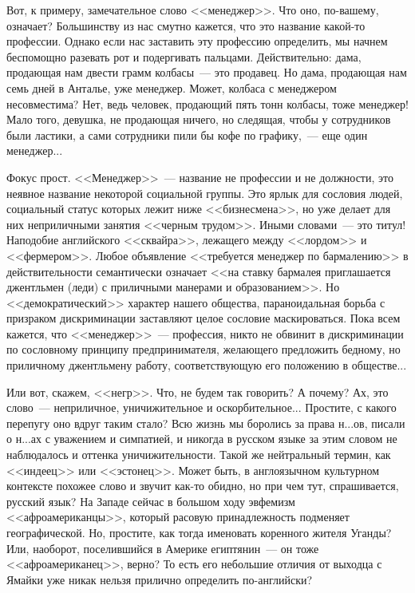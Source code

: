 \documentclass{scrbook}
\newcommand{\flqq}{<<}
\newcommand{\frqq}{>>}
\newcommand{\mdash}{~--- }
\newcommand{\commamdash}{~--- } %
\begin{document}
Вот, к примеру, замечательное слово {\flqq}менеджер{\frqq}. Что оно, по-вашему, означает? Большинству из нас смутно кажется, что это название какой-то профессии. Однако если нас заставить эту профессию определить, мы начнем беспомощно разевать рот и подергивать пальцами. Действительно: дама, продающая нам двести грамм колбасы{\mdash}это продавец. Но дама, продающая нам семь дней в Анталье, уже менеджер. Может, колбаса с менеджером несовместима? Нет, ведь человек, продающий пять тонн колбасы, тоже менеджер! Мало того, девушка, не продающая ничего, но следящая, чтобы у сотрудников были ластики, а сами сотрудники пили бы кофе по графику,{\commamdash}еще один менеджер...

Фокус прост. {\flqq}Менеджер{\frqq}{\mdash}название не профессии и не должности, это неявное название некоторой социальной группы. Это ярлык для сословия людей, социальный статус которых лежит ниже {\flqq}бизнесмена{\frqq}, но уже делает для них неприличными занятия {\flqq}черным трудом{\frqq}. Иными словами{\mdash}это титул! Наподобие английского {\flqq}сквайра{\frqq}, лежащего между {\flqq}лордом{\frqq} и {\flqq}фермером{\frqq}. Любое объявление {\flqq}требуется менеджер по бармалению{\frqq} в действительности семантически означает {\flqq}на ставку бармалея приглашается джентльмен (леди) с приличными манерами и образованием{\frqq}. Но {\flqq}демократический{\frqq} характер нашего общества, параноидальная борьба с призраком дискриминации заставляют целое сословие маскироваться. Пока всем кажется, что {\flqq}менеджер{\frqq}{\mdash}профессия, никто не обвинит в дискриминации по сословному принципу предпринимателя, желающего предложить бедному, но приличному джентльмену работу, соответствующую его положению в обществе...

Или вот, скажем, {\flqq}негр{\frqq}. Что, не будем так говорить? А почему? Ах, это слово{\mdash}неприличное, уничижительное и оскорбительное... Простите, с какого перепугу оно вдруг таким стало? Всю жизнь мы боролись за права н...ов, писали о н...ах с уважением и симпатией, и никогда в русском языке за этим словом не наблюдалось и оттенка уничижительности. Такой же нейтральный термин, как {\flqq}индеец{\frqq} или {\flqq}эстонец{\frqq}. Может быть, в англоязычном культурном контексте похожее слово и звучит как-то обидно, но при чем тут, спрашивается, русский язык? На Западе сейчас в большом ходу эвфемизм {\flqq}афроамериканцы{\frqq}, который расовую принадлежность подменяет географической. Но, простите, как тогда именовать коренного жителя Уганды? Или, наоборот, поселившийся в Америке египтянин{\mdash}он тоже {\flqq}афроамериканец{\frqq}, верно? То есть его небольшие отличия от выходца с Ямайки уже никак нельзя прилично определить по-английски?
\end{document}
